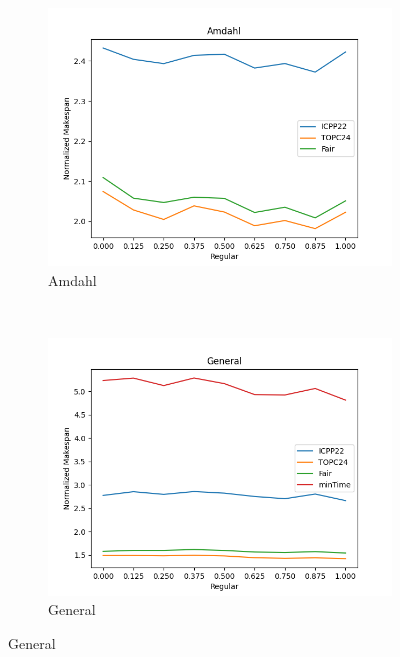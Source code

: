\documentclass{article}
\begin{document}
\begin{figure}[htbp]
\hfill
\begin{subfigure}[b]{0.32\textwidth}\includegraphics[width=\textwidth]{Results/Regular/Regular_Amdahl}\caption{Amdahl}\label{fig:lines_figures_Regular_Amdahl}\end{subfigure}
\\[2ex]
\begin{subfigure}[b]{0.32\textwidth}\includegraphics[width=\textwidth]{Results/Regular/Regular_General}\caption{General}\label{fig:lines_figures_Regular_General}\end{subfigure}
\hfill

\end{figure}
\end{document}
